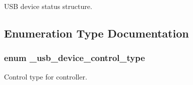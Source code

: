 U\-S\-B device status structure. 



\subsection{Enumeration Type Documentation}
\hypertarget{group__usb__device__controller__driver_gaa7a58da69289c9e774119a7998835c54}{
\subsubsection[{\-\_\-usb\-\_\-device\-\_\-control\-\_\-type}]{\setlength{\rightskip}{0pt plus 5cm}enum {\bf \-\_\-usb\-\_\-device\-\_\-control\-\_\-type}}}\label{group__usb__device__controller__driver_gaa7a58da69289c9e774119a7998835c54}


Control type for controller. 

